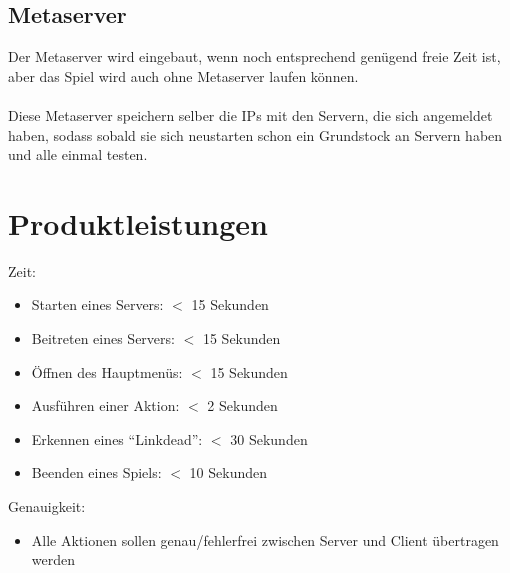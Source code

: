 \documentclass[a4paper,10pt]{article}
\begin{document}
\subsection{Metaserver}
Der Metaserver wird eingebaut, wenn noch entsprechend genügend freie Zeit ist, aber das Spiel wird auch ohne Metaserver laufen können. \\ \\
Diese Metaserver speichern selber die IPs mit den Servern, die sich angemeldet haben, sodass sobald sie sich neustarten schon ein Grundstock an Servern haben und alle einmal testen.
\section{Produktleistungen}
Zeit:
\begin{itemize}
\item Starten eines Servers: $<$ 15 Sekunden
\item Beitreten eines Servers: $<$ 15 Sekunden
\item Öffnen des Hauptmenüs: $<$ 15 Sekunden
\item Ausführen einer Aktion: $<$ 2 Sekunden
\item Erkennen eines ``Linkdead'': $<$ 30 Sekunden
\item Beenden eines Spiels: $<$ 10 Sekunden
\end{itemize}
Genauigkeit:
\begin{itemize}
\item Alle Aktionen sollen genau/fehlerfrei zwischen Server und Client übertragen werden
\end{itemize}
\end{document}
